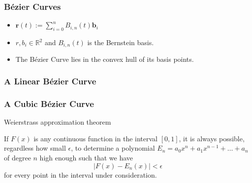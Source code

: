 \documentclass[mathserif,serif]{beamer}
\begin{document}
\begin{frame}
  \frametitle{B\'ezier Curves}
  \begin{itemize}
  \item<+-> $\mathbf{r}(t) := \sum_{i=0}^{n} B_{i,n}(t) \mathbf{b}_i$
  \item<+-> $r, b_i \in \mathbb{R}^2$ and $B_{i,n}(t)$ is the Bernstein basis.
  \item<+-> The B\'ezier Curve lies in the convex hull of its basis points.
\end{itemize}
 \end{frame}

\begin{frame}
  \frametitle{A Linear B\'ezier Curve}
  \begin{figure}
  \centering
\end{figure}
\end{frame}

\begin{frame}
  \frametitle{A Cubic B\'ezier Curve}
\begin{figure}
  \centering
\end{figure}
\end{frame}

\begin{frame}{Weierstrass approximation theorem}
\begin{theorem}
If $F(x)$ is any continuous function in the interval $[0,1]$, it is always possible, regardless how small $\epsilon$, to determine a polynomial $E_n=a_0x^n+a_1x^{n-1}+\dots+a_n$ of degree $n$ high enough such that we have
\begin{equation*}
    |F(x)-E_n(x)|<\epsilon
\end{equation*}
for every point in the interval under consideration.
\end{theorem}
\end{frame}
\end{document}
